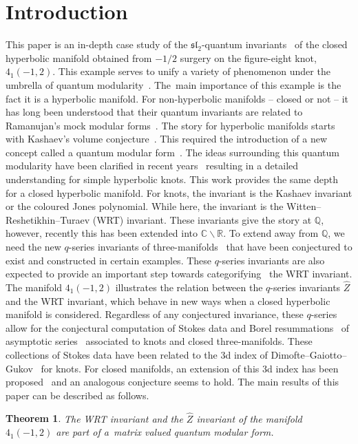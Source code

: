 \documentclass[pdftex]{sigma}
\numberwithin{equation}{section}
\newtheorem{Theorem}{Theorem}[section]
\def\BQ{\mathbb{Q}}
\def\BR{\mathbb{R}}
\def\BC{\mathbb{C}}
\def\BQ{\mathbb Q}
\def\BR{\mathbb R}
\def\BC{\mathbb C}
\begin{document}

\tableofcontents

\section{Introduction}

This paper is an in-depth case study of the $\mathfrak{sl}_{2}$-quantum invariants~\cite{Jones,RT:3man,Turaev:book,Witten} of the closed hyperbolic manifold obtained from $-1/2$ surgery on the figure-eight knot, $4_{1}(-1,2)$. This example serves to unify a variety of phenomenon under the umbrella of quantum modularity~\cite{Zagier:Qmod}. The~main importance of this example is the fact it is a hyperbolic manifold. For non-hyperbolic manifolds -- closed or not -- it has long been understood that their quantum invariants are related to Ramanujan's mock modular forms~\cite{AM:res,Cheng:3dmod,Hikami,LawrenceZag,Nahm:Blochgrp,Zagier:Vas}. The story for hyperbolic manifolds starts with Kashaev's volume conjecture~\cite{Kashaev:VC,Murakami2}. This required the introduction of a new concept called a quantum modular form~\cite{Zagier:Qmod}. The ideas surrounding this quantum modularity have been clarified in recent years~\cite{BetDrap,Cheng:3dmod,GK:rat,GK:qser,GZ:qser,GZ:RQMOD,Zagier:qmod.hol.lec} resulting in a detailed understanding for simple hyperbolic knots. This work provides the same depth for a closed hyperbolic manifold. For knots, the invariant is the Kashaev invariant or the coloured Jones polynomial. While here, the invariant is the Witten--Reshetikhin--Turaev (WRT) invariant. These invariants give the story at $\BQ$, however, recently this has been extended into $\BC\smallsetminus \BR$. To extend away from $\BQ$, we need the new $q$-series invariants of three-manifolds~\cite{BeemDimPas,Cheng:3dmod,GZ:qser,GukovMan,GPPV,GPV} that have been conjectured to exist and constructed in certain examples. These $q$-series invariants are also expected to provide an important step towards categorifying~\cite{Khovanov} the WRT invariant. The manifold $4_1(-1,2)$ illustrates the relation between the $q$-series invariants $\widehat{Z}$ and the WRT invariant, which behave in new ways when a closed hyperbolic manifold is considered. Regardless of any conjectured invariance, these $q$-series allow for the conjectural computation of Stokes data and Borel resummations~\cite{BeemDimPas,GGM:II,GGM:I,GGMW,GZ:qser,GMP} of asymptotic series~\cite{DimGar:QC,DGLZ,Gang,GSW,Hikami:stateint} associated to knots and closed three-manifolds. These collections of Stokes data have been related to the 3d index of Dimofte--Gaiotto--Gukov~\cite{DGG,GGM:I} for knots. For closed manifolds, an extension of this 3d index has been proposed~\cite{Gang3d} and an analogous conjecture seems to hold. The main results of this paper can be described as follows.
\begin{Theorem}
 The WRT invariant and the $\widehat{Z}$ invariant of the manifold $4_1(-1,2)$ are part of a~matrix valued quantum modular form.
\end{Theorem}
\end{document}
